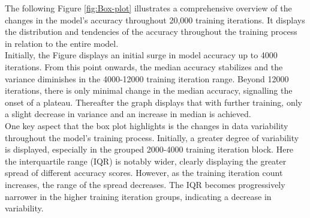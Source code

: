 The following Figure \ref{fig:Box-plot} illustrates a comprehensive overview of the changes in the model's accuracy throughout 20,000 training iterations. It displays the distribution and tendencies of the accuracy throughout the training process in relation to the entire model.\\

Initially, the Figure displays an initial surge in model accuracy up to 4000 iterations. From this point onwards, the median accuracy stabilizes and the variance diminishes in the 4000-12000 training iteration range. Beyond 12000 iterations, there is only minimal change in the median accuracy, signalling the onset of a plateau. Thereafter the graph displays that with further training, only a slight decrease in variance and an increase in median is achieved. \\

One key aspect that the box plot highlights is the changes in data variability throughout the model's training process. Initially, a greater degree of variability is displayed, especially in the grouped 2000-4000 training iteration block. Here the interquartile range (IQR) is notably wider, clearly displaying the greater spread of different accuracy scores.  However, as the training iteration count increases, the range of the spread decreases. The IQR becomes progressively narrower in the higher training iteration groups, indicating a decrease in variability. \\


